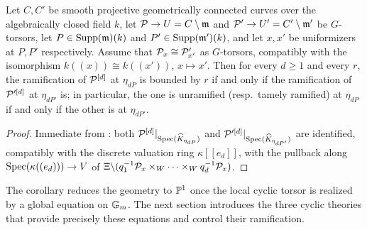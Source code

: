 \begin{cor}[Reduction to $\bP^1$]\label{cor:reduction_to_P1}
    Let $C, C'$ be smooth projective geometrically connected curves over the algebraically closed field $k$, let
    $\mathcal{P} \to U = C \setminus \mathfrak{m}$ and $\mathcal{P}' \to U' = C' \setminus \mathfrak{m}'$ be $G$-torsors, let
    $P \in \mathrm{Supp}(\mathfrak{m})(k)$ and $P' \in \mathrm{Supp}(\mathfrak{m}')(k)$, and let $x, x'$ be uniformizers at $P, P'$
    respectively. Assume that $\mathcal{P}_x \cong \mathcal{P}'_{x'}$ as $G$-torsors, compatibly with the isomorphism
    $k((x)) \cong k((x'))$, $x \mapsto x'$.
    Then for every $d \geq 1$ and every $r$, the ramification of $\mathcal{P}^{[d]}$ at $\eta_{dP}$ is bounded by $r$ if and only if
    the ramification of $\mathcal{P}'^{[d]}$ at $\eta_{dP'}$ is; in particular, the one is unramified (resp.\ tamely ramified) at
    $\eta_{dP}$ if and only if the other is at $\eta_{dP'}$.
\end{cor}
\begin{proof}
    Immediate from : both $\mathcal{P}^{[d]}|_{\operatorname{Spec}(\widehat{K}_{\eta_{dP}})}$ and
    $\mathcal{P}'^{[d]}|_{\operatorname{Spec}(\widehat{K}_{\eta_{dP'}})}$ are identified, compatibly with the discrete valuation ring
    $\kappa[[e_d]]$, with the pullback along $\operatorname{Spec}(\kappa((e_d))) \to V$ of
    $\Xi \backslash (q_1^{-1}\mathcal{P}_x \times_W \cdots \times_W q_d^{-1}\mathcal{P}_x)$.
\end{proof}

The corollary reduces the geometry to $\bP^1$ once the local cyclic torsor is
realized by a global equation on $\mathbb{G}_m$. The next section introduces the three
cyclic theories that provide precisely these equations and control their
ramification.
